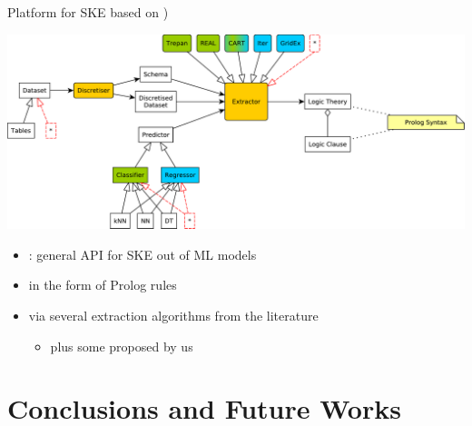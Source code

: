 \documentclass[presentation]{beamer}\mode<presentation>{\usetheme{AMSBolognaFC}}
\begin{document}
\begin{frame}{Platform for SKE based on \twopkt{})}
    \begin{center}
        \includegraphics[width=.8\linewidth]{figures/Psyke.pdf}
    \end{center}
    \vfill
    \begin{itemize}
        \item \alert{\psyke{}}: general \alert{API} for \alert{SKE} out of ML models
        \vfill
        \item in the form of \alert{Prolog rules}
        \vfill
        \item via several extraction algorithms from the literature
        \begin{itemize}
            \item plus some proposed by us
        \end{itemize}
    \end{itemize}
\end{frame}

\section{Conclusions and Future Works}
\end{document}
